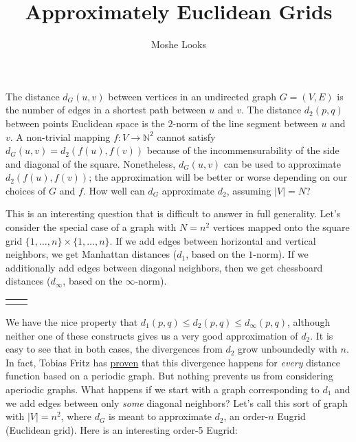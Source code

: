 \documentclass[letterpaper]{article}
\begin{document}
\title{Approximately Euclidean Grids}
\author{Moshe Looks}

\maketitle

The distance $d_G(u, v)$ between vertices in an undirected graph $G = (V, E)$ is the number
of edges in a shortest path between $u$ and $v$. The distance $d_2(p, q)$ between points
Euclidean space is the $2$-norm of the line segment between $u$ and $v$. A non-trivial
mapping $f : V \to \mathbb{N}^2$ cannot satisfy $d_G(u, v) = d_2(f(u), f(v))$ because of the
incommensurability of the side and diagonal of the square. Nonetheless, $d_G(u, v)$ can be
used to approximate $d_2(f(u), f(v))$; the approximation will be better or worse depending on
our choices of $G$ and $f$. How well can $d_G$ approximate $d_2$, assuming $|V| = N$?

This is an interesting question that is difficult to answer in full generality. Let's
consider the special case of a graph with $N = n^2$ vertices mapped onto the square grid
$\{1, \ldots, n\} \times \{1, \ldots, n\}$. If we add edges between horizontal and vertical
neighbors, we get Manhattan distances ($d_1$, based on the $1$-norm). If we additionally add
edges between diagonal neighbors, then we get chessboard distances ($d_\infty$, based on the
$\infty$-norm).

\setlength{\tabcolsep}{15pt}
\begin{tabular}{ l r}
   & 
\end{tabular}

We have the nice property that $d_1(p, q) \leq d_2(p, q) \leq d_\infty(p, q)$, although
neither one of these constructs gives us a very good approximation of $d_2$. It is easy to
see that in both cases, the divergences from $d_2$ grow unboundedly with $n$.  In fact,
Tobias Fritz has \href{https://arxiv.org/abs/1109.1963}{proven} that this divergence happens
for \emph{every} distance function based on a periodic graph. But nothing prevents us from
considering aperiodic graphs. What happens if we start with a graph corresponding to $d_1$
and we add edges between only \emph{some} diagonal neighbors? Let's call this sort of graph
with $|V| = n^2$, where $d_G$ is meant to approximate $d_2$, an order-$n$ Eugrid (Euclidean
grid). Here is an interesting order-5 Eugrid:

\begin{center}
  
\end{center}
\end{document}
